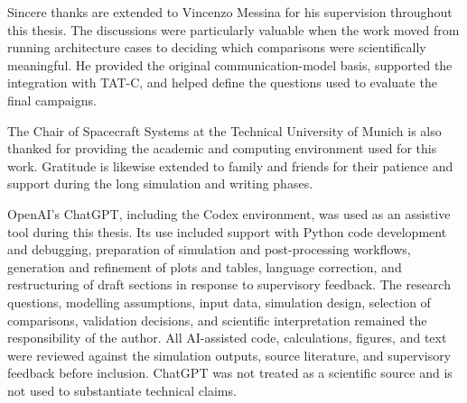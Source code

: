 Sincere thanks are extended to Vincenzo Messina for his supervision throughout this thesis. The discussions were particularly valuable when the work moved from running architecture cases to deciding which comparisons were scientifically meaningful. He provided the original communication-model basis, supported the integration with TAT-C, and helped define the questions used to evaluate the final campaigns.

The Chair of Spacecraft Systems at the Technical University of Munich is also thanked for providing the academic and computing environment used for this work. Gratitude is likewise extended to family and friends for their patience and support during the long simulation and writing phases.

OpenAI's ChatGPT, including the Codex environment, was used as an assistive tool during this thesis. Its use included support with Python code development and debugging, preparation of simulation and post-processing workflows, generation and refinement of plots and tables, language correction, and restructuring of draft sections in response to supervisory feedback. The research questions, modelling assumptions, input data, simulation design, selection of comparisons, validation decisions, and scientific interpretation remained the responsibility of the author. All AI-assisted code, calculations, figures, and text were reviewed against the simulation outputs, source literature, and supervisory feedback before inclusion. ChatGPT was not treated as a scientific source and is not used to substantiate technical claims.
